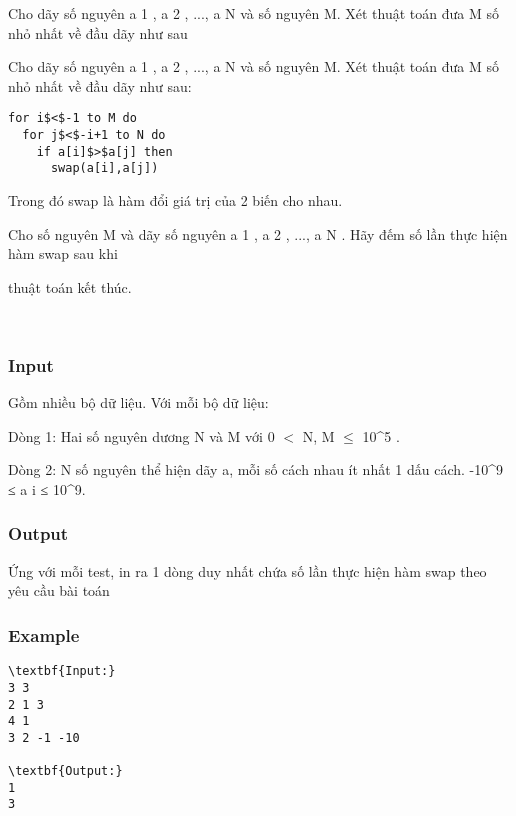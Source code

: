 

Cho dãy số nguyên a 1 , a 2 , ..., a N và số nguyên M. Xét thuật toán đưa M số nhỏ nhất về đầu dãy như sau

Cho dãy số nguyên a 1 , a 2 , ..., a N và số nguyên M. Xét thuật toán đưa M số nhỏ nhất về đầu dãy như sau:
\begin{verbatim}
for i$<$-1 to M do
  for j$<$-i+1 to N do
    if a[i]$>$a[j] then
      swap(a[i],a[j])\end{verbatim}

Trong đó swap là hàm đổi giá trị của 2 biến cho nhau.

Cho số nguyên M và dãy số nguyên a 1 , a 2 , ..., a N . Hãy đếm số lần thực hiện hàm swap sau khi

thuật toán kết thúc.

 

\subsubsection{Input}

Gồm nhiều bộ dữ liệu. Với mỗi bộ dữ liệu:

Dòng 1: Hai số nguyên dương N và M với 0 $<$ N, M  $\le$  10^5 .

Dòng 2: N số nguyên thể hiện dãy a, mỗi số cách nhau ít nhất 1 dấu cách. -10^9 ≤ a i ≤ 10^9.

\subsubsection{Output}

Ứng với mỗi test, in ra 1 dòng duy nhất chứa số lần thực hiện hàm swap theo yêu cầu bài toán

\subsubsection{Example}
\begin{verbatim}
\textbf{Input:}
3 3
2 1 3
4 1
3 2 -1 -10

\textbf{Output:}
1
3\end{verbatim}
